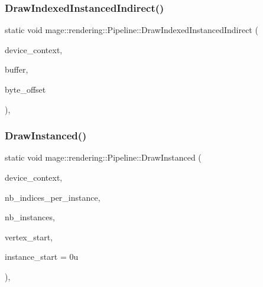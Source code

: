 \mbox{\label{structmage_1_1rendering_1_1_pipeline_a51e2744827cbcf7791fcb40c0131d11b}} 
\subsubsection{\texorpdfstring{Draw\+Indexed\+Instanced\+Indirect()}{DrawIndexedInstancedIndirect()}}
{\footnotesize\ttfamily static void mage\+::rendering\+::\+Pipeline\+::\+Draw\+Indexed\+Instanced\+Indirect (\begin{DoxyParamCaption}\item[{I\+D3\+D11\+Device\+Context \&}]{device\+\_\+context,  }\item[{I\+D3\+D11\+Buffer \&}]{buffer,  }\item[{\mbox{\hyperlink{namespacemage_aa5d6eaabaac3cdd01873d6a3d27e90f3}{U32}}}]{byte\+\_\+offset }\end{DoxyParamCaption})\hspace{0.3cm}{\ttfamily [static]}, {\ttfamily [noexcept]}}

\mbox{\label{structmage_1_1rendering_1_1_pipeline_af0d8580b1c0a672c3fc9558dc19408a3}} 
\subsubsection{\texorpdfstring{Draw\+Instanced()}{DrawInstanced()}}
{\footnotesize\ttfamily static void mage\+::rendering\+::\+Pipeline\+::\+Draw\+Instanced (\begin{DoxyParamCaption}\item[{I\+D3\+D11\+Device\+Context \&}]{device\+\_\+context,  }\item[{\mbox{\hyperlink{namespacemage_aa5d6eaabaac3cdd01873d6a3d27e90f3}{U32}}}]{nb\+\_\+indices\+\_\+per\+\_\+instance,  }\item[{\mbox{\hyperlink{namespacemage_aa5d6eaabaac3cdd01873d6a3d27e90f3}{U32}}}]{nb\+\_\+instances,  }\item[{\mbox{\hyperlink{namespacemage_aa5d6eaabaac3cdd01873d6a3d27e90f3}{U32}}}]{vertex\+\_\+start,  }\item[{\mbox{\hyperlink{namespacemage_aa5d6eaabaac3cdd01873d6a3d27e90f3}{U32}}}]{instance\+\_\+start = {\ttfamily 0u} }\end{DoxyParamCaption})\hspace{0.3cm}{\ttfamily [static]}, {\ttfamily [noexcept]}}

